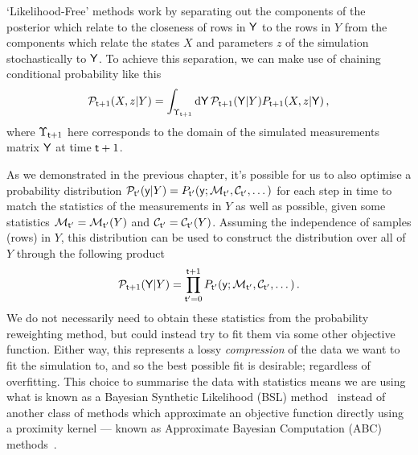 `Likelihood-Free' methods work by separating out the components of the posterior which relate to the closeness of rows in ${\sf Y}$ to the rows in $Y$ from the components which relate the states $X$ and parameters $z$ of the simulation stochastically to ${\sf Y}$. To achieve this separation, we can make use of chaining conditional probability like this
\begin{align}
{\cal P}_{{\sf t}+1}(X,z\vert Y)=\int_{\Upsilon_{{\sf t}+1}} {\rm d}{\sf Y} \, {\cal P}_{{\sf t}+1}({\sf Y}\vert Y) P_{{\sf t}+1}(X,z \vert {\sf Y}) \label{eq:likelihood-free-posterior} \,,
\end{align}
where $\Upsilon_{{\sf t}+1}$ here corresponds to the domain of the simulated measurements matrix ${\sf Y}$ at time ${\sf t}+1$.

As we demonstrated in the previous chapter, it's possible for us to also optimise a probability distribution ${\cal P}_{{\sf t}'}({\sf y}\vert Y) = P_{{\sf t}'}({\sf y};{\cal M}_{{\sf t}'},{\cal C}_{{\sf t}'},\dots )$ for each step in time to match the statistics of the measurements in $Y$ as well as possible, given some statistics ${\cal M}_{{\sf t}'}={\cal M}_{{\sf t}'}(Y)$ and ${\cal C}_{{\sf t}'}={\cal C}_{{\sf t}'}(Y)$. Assuming the independence of samples (rows) in $Y$, this distribution can be used to construct the distribution over all of $Y$ through the following product
\begin{align}
{\cal P}_{{\sf t}+1}({\sf Y}\vert Y) = \prod_{{\sf t}'=0}^{{\sf t}+1}P_{{\sf t}'}({\sf y};{\cal M}_{{\sf t}'},{\cal C}_{{\sf t}'},\dots ) \,.
\end{align}
 We do not necessarily need to obtain these statistics from the probability reweighting method, but could instead try to fit them via some other objective function. Either way, this represents a lossy \emph{compression} of the data we want to fit the simulation to, and so the best possible fit is desirable; regardless of overfitting. This choice to summarise the data with statistics means we are using what is known as a Bayesian Synthetic Likelihood (BSL) method~\cite{price2018bayesian,wood2010statistical} instead of another class of methods which approximate an objective function directly using a proximity kernel --- known as Approximate Bayesian Computation (ABC) methods~\cite{sisson2018handbook}.

